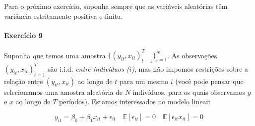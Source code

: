 \documentclass[10pt,a4paper]{article}
\begin{document}
  \vspace{1em}
 Para o próximo exercício, suponha sempre que as variáveis aleatórias têm variância estritamente positiva e finita.
 
 
 \paragraph{Exercício 9} Suponha que temos uma amostra $\{(y_{it}, x_{it})_{t=1}^T\}_{i=1}^N$. As observações $(y_{it},x_{it})_{t=1}^T$ são i.i.d. \emph{entre indivíduos ($i$)}, mas não impomos restrições sobre a relação entre $(y_{it}, x_{it})$ ao longo de $t$ para um mesmo $i$ (você pode pensar que selecionamos uma amostra aleatória de $N$ indivíduos, para os quais observamos $y$ e $x$ ao longo de $T$ períodos). Estamos interessados no modelo linear:
 
 \begin{equation}
 	y_{it} =  \beta_0 + \beta_1 x_{it} + \epsilon_{it} 
 	\quad \mathbb{E}[\epsilon_{it}]=0 
 	\quad \mathbb{E}[\epsilon_{it} x_{it}] = 0
 \end{equation}
 
\end{document}
